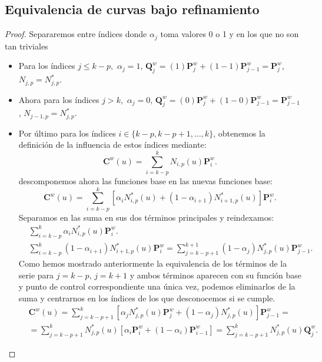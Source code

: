 \documentclass[11pt]{book}
\theoremstyle{plain} %
\theoremstyle{definition} %
\theoremstyle{definition} %
\begin{document}
\subsection{Equivalencia de curvas bajo refinamiento}
\label{sec:refinement_proof}
\begin{proof} Separaremos entre índices donde $\alpha_j$ toma valores 0 o 1 y en los que no son tan triviales
        \begin{itemize}
            
        \item Para los índices $j\leq k-p$,\, $\alpha_j=1, \, \mathbf{Q}_{j}^{w} = (1) \mathbf{P}_{j}^{w} + (1 - 1) \mathbf{P}_{j-1}^{w} =  \mathbf{P}_{j}^{w}$, $N_{j,p}=N^*_{j,p}$.

        \item Ahora para los índices $j > k$,\, $\alpha_j=0, \, \mathbf{Q}_{j}^{w} = (0) \mathbf{P}_{j}^{w} + (1 - 0) \mathbf{P}_{j-1}^{w} =  \mathbf{P}_{j-1}^{w}$, $N_{j-1,p}=N^*_{j,p}$.
    
        \item Por último para los índices $i \in \{k-p, k-p+1, \dots, k\}$, obtenemos la definición de la influencia de estos índices mediante:
        \begin{equation*}
            \mathbf{C}^{w}(u) = \sum_{i=k-p}^{k} N_{i,p}(u) \mathbf{P}_{i}^{w}.
        \end{equation*}
        descomponemos ahora las funciones base en las nuevas funciones base:
        \begin{equation*}
            \mathbf{C}^{w}(u) = \sum_{i=k-p}^{k} [\alpha_{i} N_{i,p}^*(u) + (1 - \alpha_{i+1}) N_{i+1,p}^*(u)] \mathbf{P}_{i}^{w}.
        \end{equation*}
        Separamos en las suma en sus dos términos principales y reindexamos:
        \begin{align*}
            &\sum_{i=k-p}^{k} \alpha_{i} N_{i,p}^*(u) \mathbf{P}_{i}^{w}.\\
            &\sum_{i=k-p}^{k} (1 - \alpha_{i+1}) N_{i+1,p}^*(u) \mathbf{P}_{i}^{w}=\sum_{j=k-p+1}^{k+1} (1 - \alpha_j) N_{j,p}^*(u) \mathbf{P}_{j-1}^{w}.
        \end{align*}
        Como hemos mostrado anteriormente la equivalencia de los términos de la serie para $j=k-p, \, j=k+1$ y ambos términos aparecen con su función base y punto de control correspondiente una única vez, podemos eliminarlos de la suma y centrarnos en los índices de los que desconocemos si se cumple.
        \begin{align*}
            &\mathbf{C}^{w}(u) = \sum_{j=k-p+1}^{k} [\alpha_{j} N_{j,p}^*(u)\mathbf{P}_{j}^{w} + (1 - \alpha_j) N_{j,p}^*(u)] \mathbf{P}_{j-1}^{w}=\\
            &=\sum_{j=k-p+1}^{k} N_{j,p}^*(u)\left[\alpha_i \mathbf{P}_{i}^{w} + (1 - \alpha_i) \mathbf{P}_{i-1}^{w} \right]=\sum_{j=k-p+1}^{k} N_{j,p}^*(u) \mathbf{Q}_{j}^{w}.
        \end{align*}
        
        \end{itemize}
    \end{proof}
\end{document}
